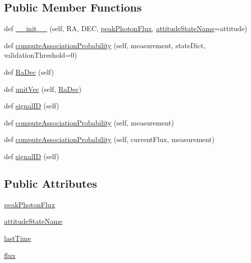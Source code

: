 \subsection*{Public Member Functions}
\begin{DoxyCompactItemize}
\item 
def \hyperlink{classSignals_1_1StaticXRayPointSource_ae3efcdb0e8a8c7fe9e3984c1cb785196}{\+\_\+\+\_\+init\+\_\+\+\_\+} (self, RA, D\+EC, \hyperlink{classSignals_1_1StaticXRayPointSource_a7e16da6506ee1b83c9858dce9c7856ea}{peak\+Photon\+Flux}, \hyperlink{classSignals_1_1PointSource_a151f2600c3623d1ca49fb51feb8a1178}{attitude\+State\+Name}=\textquotesingle{}attitude\textquotesingle{})
\item 
def \hyperlink{classSignals_1_1StaticXRayPointSource_a0533a3647597c6ad91c238ab2b97a829}{compute\+Association\+Probability} (self, measurement, state\+Dict, validation\+Threshold=0)
\item 
def \hyperlink{classSignals_1_1PointSource_a5fbb36eda0901536d77eff9a3262ae9e}{Ra\+Dec} (self)
\item 
def \hyperlink{classSignals_1_1PointSource_aec5f944753a4c097e99da175ec848a92}{unit\+Vec} (self, \hyperlink{classSignals_1_1PointSource_a5fbb36eda0901536d77eff9a3262ae9e}{Ra\+Dec})
\item 
def \hyperlink{classSignals_1_1SignalSource_a85016cca8a7f1e188d314ced50577d05}{signal\+ID} (self)
\item 
def \hyperlink{classSignals_1_1StaticPoissonSource_a61351ebf4f75f28e227cfee7ca7e5d64}{compute\+Association\+Probability} (self, measurement)
\item 
def \hyperlink{classSignals_1_1PoissonSource_a8e7a6023e7ee53ed0b5b81c7d0aa361c}{compute\+Association\+Probability} (self, current\+Flux, measurement)
\item 
def \hyperlink{classSignals_1_1SignalSource_a85016cca8a7f1e188d314ced50577d05}{signal\+ID} (self)
\end{DoxyCompactItemize}
\subsection*{Public Attributes}
\begin{DoxyCompactItemize}
\item 
\hyperlink{classSignals_1_1StaticXRayPointSource_a7e16da6506ee1b83c9858dce9c7856ea}{peak\+Photon\+Flux}
\item 
\hyperlink{classSignals_1_1PointSource_a151f2600c3623d1ca49fb51feb8a1178}{attitude\+State\+Name}
\item 
\hyperlink{classSignals_1_1PoissonSource_a66b0f3fb48cc130b6b07d7427092a522}{last\+Time}
\item 
\hyperlink{classSignals_1_1PoissonSource_a26e7bf25b1d9195bfded2a3ad6790bce}{flux}
\end{DoxyCompactItemize}
